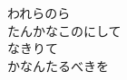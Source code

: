 \documentclass[10pt,b5j]{tarticle} %
\begin{document}
\begin{enumerate}
\begin{minipage}[c]{\blocksize}
        \vspace{\linespace}
        \item
        われらのら\\
        たんかなこのにして\\
        なきりて\\
        かなんたるべきを
    
    \end{minipage}
\end{enumerate} %
\end{document}
